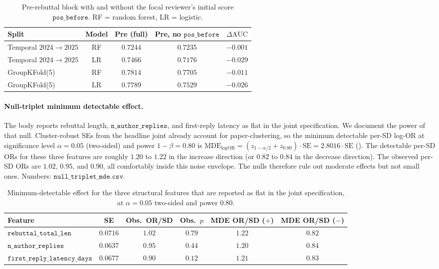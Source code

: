 \documentclass{article}
\newcommand{\code}[1]{\texttt{#1}}
\newcommand{\auc}{\text{AUC}}
\begin{document}
\begin{table}[htbp]
    \centering
    \caption{Pre-rebuttal block with and without the focal reviewer's initial score $\code{pos\_before}$. RF = random forest, LR = logistic.}
    \label{tab:pre-no-score}
    \begin{tabular}{lcccc}
    \toprule
    Split & Model & Pre (full) & Pre, no $\code{pos\_before}$ & $\Delta\auc$ \\
    \midrule
    Temporal $2024 \to 2025$ & RF & $0.7244$ & $0.7235$ & $-0.001$ \\
    Temporal $2024 \to 2025$ & LR & $0.7466$ & $0.7176$ & $-0.029$ \\
    GroupKFold(5)            & RF & $0.7814$ & $0.7705$ & $-0.011$ \\
    GroupKFold(5)            & LR & $0.7789$ & $0.7529$ & $-0.026$ \\
    \bottomrule
    \end{tabular}
\end{table}

\paragraph{Null-triplet minimum detectable effect.} The body reports rebuttal length, $\code{n\_author\_replies}$, and first-reply latency as flat in the joint specification. We document the power of that null. Cluster-robust SEs from the headline joint already account for paper-clustering, so the minimum detectable per-SD log-OR at significance level $\alpha = 0.05$ (two-sided) and power $1-\beta = 0.80$ is $\text{MDE}_{\log\text{OR}} = (z_{1-\alpha/2} + z_{0.80}) \cdot \text{SE} = 2.8016 \cdot \text{SE}$ (). The detectable per-SD ORs for these three features are roughly $1.20$ to $1.22$ in the increase direction (or $0.82$ to $0.84$ in the decrease direction). The observed per-SD ORs are $1.02$, $0.95$, and $0.90$, all comfortably inside this noise envelope. The nulls therefore rule out moderate effects but not small ones. Numbers: $\code{null\_triplet\_mde.csv}$.

\begin{table}[htbp]
    \centering
    \small
    \caption{Minimum-detectable effect for the three structural features that are reported as flat in the joint specification, at $\alpha=0.05$ two-sided and power $0.80$.}
    \label{tab:null-triplet-mde}
    \setlength{\tabcolsep}{4pt}
    \begin{tabular}{lccccc}
    \toprule
    Feature & SE & Obs.\ OR/SD & Obs.\ $p$ & MDE OR/SD ($+$) & MDE OR/SD ($-$) \\
    \midrule
    $\code{rebuttal\_total\_len}$        & $0.0716$ & $1.02$ & $0.79$ & $1.22$ & $0.82$ \\
    $\code{n\_author\_replies}$          & $0.0637$ & $0.95$ & $0.44$ & $1.20$ & $0.84$ \\
    $\code{first\_reply\_latency\_days}$ & $0.0677$ & $0.90$ & $0.12$ & $1.21$ & $0.83$ \\
    \bottomrule
    \end{tabular}
\end{table}
\end{document}
